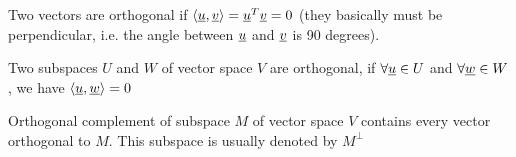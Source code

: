 \begin{remark}
Two vectors are orthogonal if $\langle\underline{u},\underline{v}\rangle = \underline{u}^T\underline{v} = 0$ (they basically must be perpendicular, i.e. the angle between  $\underline{u}$ and $\underline{v}$ is 90 degrees).
\end{remark}
\begin{definition}
Two subspaces $U$ and $W$ of vector space $V$ are orthogonal, if $\forall \underline{u}\in U$ and $\forall \underline{w}\in W$, we have $\langle \underline{u},\underline{w}\rangle = 0$
\end{definition}

\begin{definition}
Orthogonal complement of subspace $M$ of vector space $V$ contains every vector orthogonal to $M$. This subspace is usually denoted by $M^\perp$
\end{definition}

